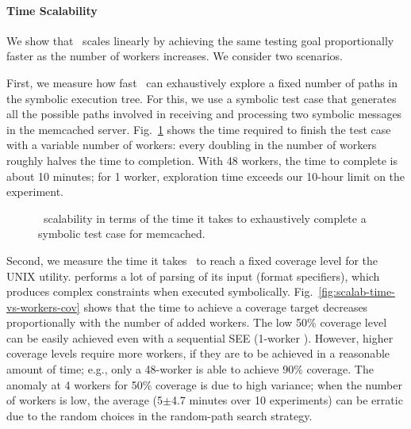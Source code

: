 \paragraph{Time Scalability} We show that \cnine\ scales linearly by achieving the same testing goal proportionally faster as the number of workers increases. We consider two scenarios.

First, we measure how fast \cnine\ can exhaustively explore a fixed number of paths in the symbolic execution tree.  For this, we use a symbolic test case that generates all the possible paths involved in receiving and processing two symbolic messages in the memcached server.  Fig.~\ref{fig:scalab-time-vs-workers} shows the time required to finish the test case with a variable number of workers: every doubling in the number of workers roughly halves the time to completion.  With 48 workers, the time to complete is about 10 minutes; for 1 worker,  exploration time exceeds our 10-hour limit on the experiment.  


\begin{figure}[h!]
  \centering
  \caption{\cnine\ scalability in terms of the time it takes to exhaustively complete a symbolic test case for memcached.}
  \label{fig:scalab-time-vs-workers}
\end{figure}

Second, we measure the time it takes \cnine\ to reach a fixed coverage level for the  UNIX utility.   performs a lot of parsing of its input (format specifiers), which produces complex constraints when executed symbolically.   Fig.~\ref{fig:scalab-time-vs-workers-cov} shows that the time to achieve a coverage target decreases proportionally with the number of added workers.  The low 50\% coverage level can be easily achieved even with a sequential SEE (1-worker \cnine). However, higher coverage levels require more workers, if they are to be achieved in a reasonable amount of time; e.g., only a 48-worker \cnine is able to achieve  $90\%$ coverage.  The anomaly at 4 workers for 50\% coverage is due to high variance; when the number of workers is low, the average (5$\pm$4.7 minutes over 10 experiments) can be erratic due to the random choices in the random-path search strategy.

